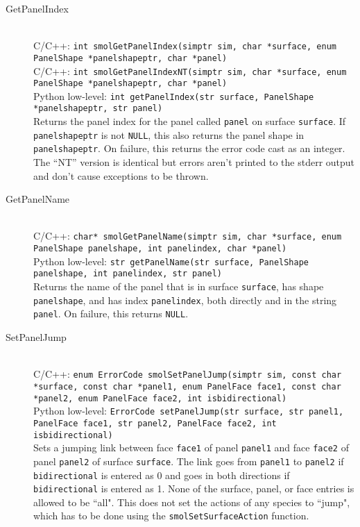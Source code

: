 \documentclass {book}
\newcommand {\ttt} {\texttt}
\begin{document}
\begin{description}
\item[GetPanelIndex]
\hfill \\
C/C++: \ttt{int smolGetPanelIndex(simptr sim, char *surface, enum PanelShape *panelshapeptr, char *panel)}\\
C/C++: \ttt{int smolGetPanelIndexNT(simptr sim, char *surface, enum PanelShape *panelshapeptr, char *panel)}\\
Python low-level: \ttt{int getPanelIndex(str surface, PanelShape *panelshapeptr, str panel)}\\
Returns the panel index for the panel called \ttt{panel} on surface \ttt{surface}. If \ttt{panelshapeptr} is not \ttt{NULL}, this also returns the panel shape in \ttt{panelshapeptr}. On failure, this returns the error code cast as an integer. The ``NT'' version is identical but errors aren't printed to the stderr output and don't cause exceptions to be thrown.

\item[GetPanelName]
\hfill \\
C/C++: \ttt{char* smolGetPanelName(simptr sim, char *surface, enum PanelShape panelshape, int panelindex, char *panel)}\\
Python low-level: \ttt{str getPanelName(str surface, PanelShape panelshape, int panelindex, str panel)}\\
Returns the name of the panel that is in surface \ttt{surface}, has shape \ttt{panelshape}, and has index \ttt{panelindex}, both directly and in the string \ttt{panel}. On failure, this returns \ttt{NULL}.

\item[SetPanelJump]
\hfill \\
C/C++: \ttt{enum ErrorCode smolSetPanelJump(simptr sim, const char *surface, const char *panel1, enum PanelFace face1, const char *panel2, enum PanelFace face2, int isbidirectional)}\\
Python low-level: \ttt{ErrorCode setPanelJump(str surface, str panel1, PanelFace face1, str panel2, PanelFace face2, int isbidirectional)}\\
Sets a jumping link between face \ttt{face1} of panel \ttt{panel1} and face \ttt{face2} of panel \ttt{panel2} of surface \ttt{surface}. The link goes from \ttt{panel1} to \ttt{panel2} if \ttt{bidirectional} is entered as 0 and goes in both directions if \ttt{bidirectional} is entered as 1. None of the surface, panel, or face entries is allowed to be ``all". This does not set the actions of any species to ``jump", which has to be done using the \ttt{smolSetSurfaceAction} function.


\end{description}
\end{document}
